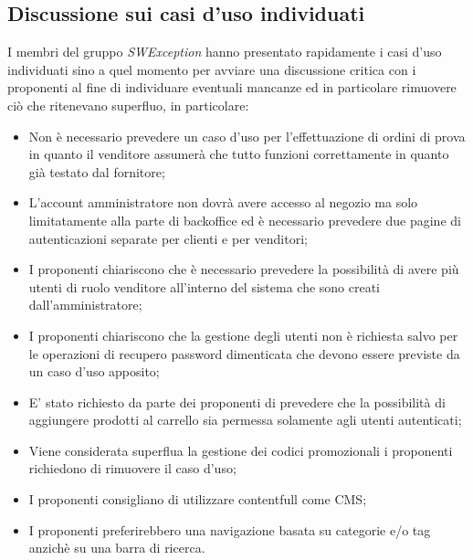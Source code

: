 \subsection{Discussione sui casi d'uso individuati}
I membri del gruppo \textit{SWException} hanno presentato rapidamente i casi d'uso individuati sino a quel momento per avviare una discussione critica con i proponenti al fine di individuare eventuali mancanze ed in particolare rimuovere ciò che ritenevano superfluo,  in particolare:
\begin{itemize}

\item Non è necessario prevedere un caso d'uso per l'effettuazione di ordini di prova in quanto il venditore assumerà che tutto funzioni correttamente in quanto già testato dal fornitore;
\item L'account amministratore non dovrà avere accesso al negozio ma solo limitatamente alla parte di backoffice ed è necessario prevedere due pagine di autenticazioni separate per clienti e per venditori;
\item I proponenti chiariscono che è necessario prevedere la possibilità di avere più utenti di ruolo venditore all'interno del sistema che sono creati dall'amministratore; 
\item I proponenti chiariscono che la gestione degli utenti non è richiesta salvo per le operazioni di recupero password dimenticata che devono essere previste da un caso d'uso apposito;
\item E' stato richiesto da parte dei proponenti di prevedere che la possibilità di aggiungere prodotti al carrello sia permessa solamente agli utenti autenticati;
\item Viene considerata superflua la gestione dei codici promozionali i proponenti richiedono di rimuovere il caso d'uso;
\item I proponenti consigliano di utilizzare contentfull come CMS;
\item I proponenti preferirebbero una navigazione basata su categorie e/o tag anzichè su una barra di ricerca.

\end{itemize}

